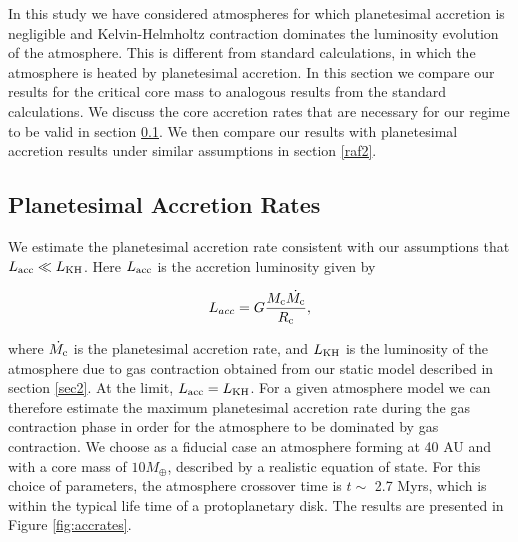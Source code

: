 \documentclass[apj]{emulateapj}
\begin{document}
In this study we have considered atmospheres for which planetesimal accretion is negligible and Kelvin-Helmholtz contraction dominates the luminosity evolution of the atmosphere. This is different from standard calculations, in which the atmosphere is heated by planetesimal accretion. In this section we compare our results for the critical core mass to analogous results from the standard calculations. We discuss the core accretion rates that are necessary for our regime to be valid in section \ref{raf1}. We then compare our results with planetesimal accretion results under similar assumptions in section \ref{raf2}.


\subsection{Planetesimal Accretion Rates}
\label{raf1}

We estimate the planetesimal accretion rate consistent with our assumptions that $L_{\mathrm{acc}} \ll L_{\rm{KH}}$. Here $L_{\rm{acc}}$ is the accretion luminosity given by

\begin{equation}
\label{eq:Lacc}
L_{acc}=G \frac{M_{\rm{c}} \dot{M_{\rm{c}}}}{R_{\rm{c}}},
\end{equation}

\noindent where $\dot{M_{\rm{c}}}$ is the planetesimal accretion rate, and $L_{\rm{KH}}$ is the luminosity of the atmosphere due to gas contraction obtained from our static model described in section \ref{sec2}. At the limit, $L_{\rm{acc}}=L_{\rm{KH}}$. For a given atmosphere model we can therefore estimate the maximum planetesimal accretion rate during the gas contraction phase in order for the atmosphere to be dominated by gas contraction. We choose as a fiducial case an atmosphere forming at 40 AU and with a core mass of $10 M_{\oplus}$, described by a realistic equation of state. For this choice of parameters, the atmosphere crossover time is $t \sim$ 2.7 Myrs, which is within the typical life time of a protoplanetary disk. The results are presented in Figure \ref{fig:accrates}. 
\end{document}
